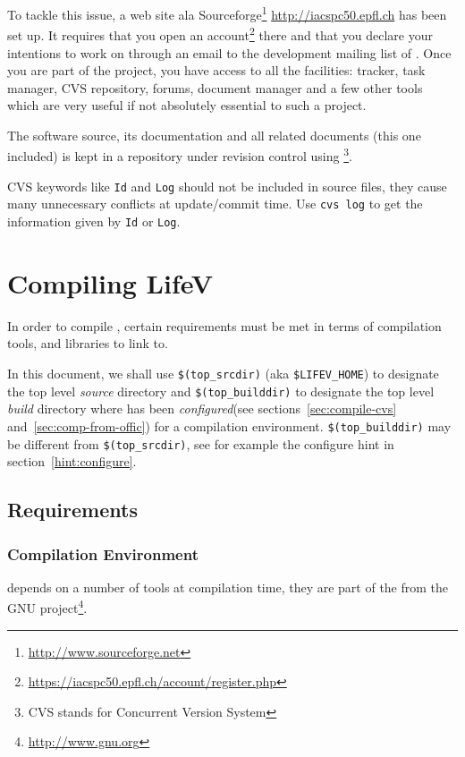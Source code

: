 To tackle this issue, a web site ala Sourceforge\footnote{\url{http://www.sourceforge.net}} \url{http://iacspc50.epfl.ch} has been set up. It requires that you open an account\footnote{\url{https://iacspc50.epfl.ch/account/register.php}} there and that you declare your intentions to work on \lifev through an email to the development mailing list of \lifev. Once you are part of the project, you have access to all the facilities: tracker, task manager, CVS repository, forums, document manager and a few other tools which are very useful if not absolutely essential to such a project.


The software source, its documentation and all related documents (this
one included) is kept in a repository under revision control
using \footnote{CVS
  stands for Concurrent Version System}.

CVS keywords like \verb!Id! and \verb!Log! should not be included in source files,
they cause many unnecessary conflicts at update/commit time. Use 
\verb!cvs log! to get the information given by \verb!Id! or \verb!Log!.

\section{Compiling LifeV}
\label{compile-lifev} 

In order to compile \lifev, certain requirements must be met in terms
of compilation tools, and libraries to link to.

\noindent In this document, we shall use \verb+$(top_srcdir)+ (aka \verb+$LIFEV_HOME+) to designate the top level \emph{source} directory 
and \verb+$(top_builddir)+ to designate the top level \emph{build}
directory where \lifev has been \emph{configured}(see
sections~\ref{sec:compile-cvs} and~\ref{sec:comp-from-offic}) for a
compilation environment.  \verb+$(top_builddir)+ may be different from
\verb+$(top_srcdir)+, see for example the configure hint in
section~\ref{hint:configure}.

\subsection{Requirements}

\subsubsection{Compilation Environment}
\label{sec:comp-envir}

\lifev depends on a number of tools at compilation time, they are part
of the  from the GNU
project\footnote{\url{http://www.gnu.org}}. 


